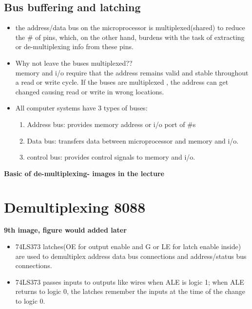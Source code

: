 \documentclass[12pt]{article}
\begin{document}
\subsection{Bus buffering and latching}
\begin{itemize}
	\item the address/data bus on the microprocessor is multiplexed(shared) to reduce the \# of pins, which, on the other hand, burdens with the task of extracting or de-multiplexing info from these pins.
	
	\item Why not leave the buses multiplexed??\\
	memory and i/o require that the address remains valid and stable throughout a read or write cycle. If the buses are multiplexed , the address can get changed causing read or write in wrong locations.
	
	\item All computer systems have 3 types of buses:
	\begin{enumerate}
		\item Address bus: provides memory address or i/o port of \#s 
		\item Data bus: transfers data between microprocessor and memory and i/o.
		\item control bus: provides control signals to memory and i/o.
	\end{enumerate}
	
\end{itemize}

\textbf{Basic of de-multiplexing- images in the lecture}

\newpage

\section{Demultiplexing 8088}
\textbf{9th image, figure would added later}\\
\begin{itemize}
	\item 74LS373 latches(OE for output enable and G or LE for latch enable inside) are used to demultiplex address data bus connections and address/status bus connections.
	
	\item 74LS373 passes inputs to outputs like wires when ALE is logic 1; when ALE returns to logic 0, the latches remember the inputs at the time of the change to logic 0. 
\end{itemize}
\end{document}

